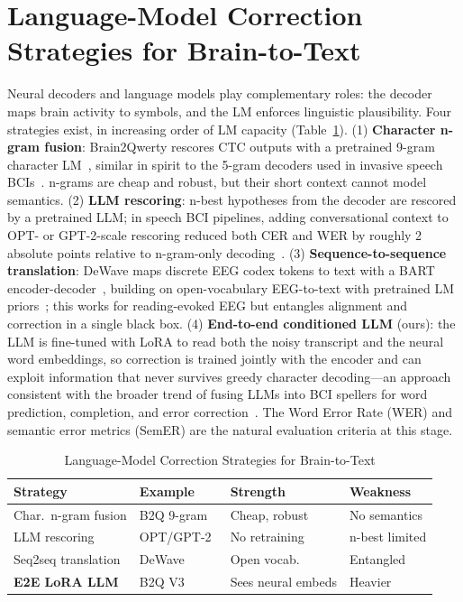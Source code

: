 \documentclass[conference]{IEEEtran}
\begin{document}
\section{Language-Model Correction Strategies for Brain-to-Text}
Neural decoders and language models play complementary roles: the decoder
maps brain activity to symbols, and the LM enforces linguistic plausibility.
Four strategies exist, in increasing order of LM capacity
(Table~\ref{tab:lm}). (1) \textbf{Character n-gram fusion}: Brain2Qwerty
rescores CTC outputs with a pretrained 9-gram character LM~\cite{levy2025},
similar in spirit to the 5-gram decoders used in invasive speech
BCIs~\cite{willett2023}. n-grams are cheap and robust, but their short
context cannot model semantics. (2) \textbf{LLM rescoring}: n-best
hypotheses from the decoder are rescored by a pretrained LLM; in speech BCI
pipelines, adding conversational context to OPT- or GPT-2-scale rescoring
reduced both CER and WER by roughly 2 absolute points relative to
n-gram-only decoding~\cite{willett2023}. (3) \textbf{Sequence-to-sequence
translation}: DeWave maps discrete EEG codex tokens to text with a BART
encoder-decoder~\cite{duan2024dewave}, building on open-vocabulary
EEG-to-text with pretrained LM priors~\cite{wang2022eeg2text}; this works
for reading-evoked EEG but entangles alignment and correction in a single
black box. (4) \textbf{End-to-end conditioned LLM} (ours): the LLM is
fine-tuned with LoRA to read both the noisy transcript and the neural word
embeddings, so correction is trained jointly with the encoder and can
exploit information that never survives greedy character decoding---an
approach consistent with the broader trend of fusing LLMs into BCI spellers
for word prediction, completion, and error correction~\cite{caria2025}. The
Word Error Rate (WER) and semantic error metrics (SemER) are the natural
evaluation criteria at this stage.

\begin{table}[t]
\centering
\caption{Language-Model Correction Strategies for Brain-to-Text}
\label{tab:lm}
\scriptsize
\begin{tabular}{@{}llll@{}}
\toprule
\textbf{Strategy} & \textbf{Example} & \textbf{Strength} & \textbf{Weakness} \\
\midrule
Char.\ n-gram fusion & B2Q 9-gram~\cite{levy2025} & Cheap, robust & No semantics \\
LLM rescoring & OPT/GPT-2~\cite{willett2023} & No retraining & n-best limited \\
Seq2seq translation & DeWave~\cite{duan2024dewave} & Open vocab. & Entangled \\
\textbf{E2E LoRA LLM} & B2Q V3~\cite{hu2022lora} & Sees neural embeds & Heavier \\
\bottomrule
\end{tabular}
\end{table}
\end{document}
